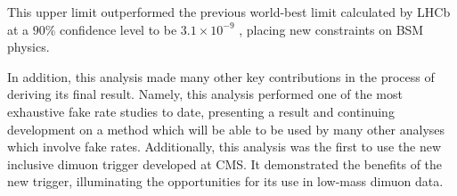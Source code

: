 This upper limit outperformed the previous world-best limit calculated by LHCb at a $90\%$ confidence level to be $3.1 \times 10^{-9}$ \cite{ref:lhcb_2023}, placing new constraints on BSM physics.

In addition, this analysis made many other key contributions in the process of deriving its final result. Namely, this analysis performed one of the most exhaustive fake rate studies to date, presenting a result and continuing development on a method which will be able to be used by many other analyses which involve fake rates. Additionally, this analysis was the first to use the new inclusive dimuon trigger developed at CMS. It demonstrated the benefits of the new trigger, illuminating the opportunities for its use in low-mass dimuon data. 
